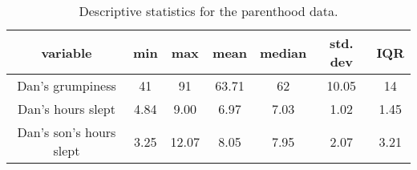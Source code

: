 \begin{table}[t]
\caption{Descriptive statistics for the parenthood data.} \tabcapsep
\label{tab:parenthood}
\begin{center}
\begin{tabular}{c|cccccc}  
variable & min & max & mean & median & std. dev & IQR \\ \hline
Dan's grumpiness & 41 & 91 & 63.71 & 62 & 10.05 & 14 \\
Dan's hours slept & 4.84 & 9.00 & 6.97 & 7.03 & 1.02 & 1.45  \\
Dan's son's hours slept & 3.25 & 12.07 & 8.05 & 7.95 & 2.07 & 3.21 \\ 
\end{tabular}
\tabcapsep
\HR
\end{center}
\end{table}


